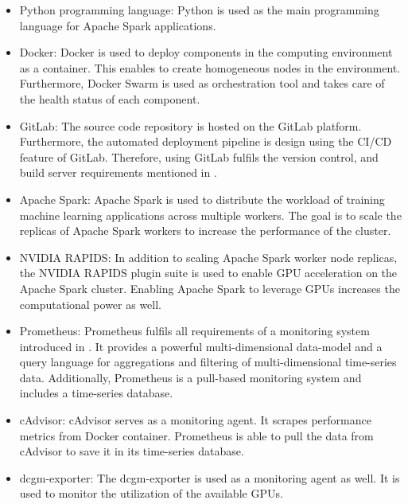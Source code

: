 \begin{itemize}
\item Python programming language: Python is used as the main programming language for Apache Spark applications.

\item Docker: Docker is used to deploy components in the computing environment as a container. This enables to create homogeneous nodes in the environment. Furthermore, Docker Swarm is used as orchestration tool and takes care of the health status of each component.

\item GitLab: The source code repository is hosted on the GitLab platform. Furthermore, the automated deployment pipeline is design using the CI/CD feature of GitLab. Therefore, using GitLab fulfils the version control, and build server requirements mentioned in .

\item Apache Spark: Apache Spark is used to distribute the workload of training machine learning applications across multiple workers. The goal is to scale the replicas of Apache Spark workers to increase the performance of the cluster.

\item NVIDIA RAPIDS: In addition to scaling Apache Spark worker node replicas, the NVIDIA RAPIDS plugin suite is used to enable GPU acceleration on the Apache Spark cluster. Enabling Apache Spark to leverage GPUs increases the computational power as well.

\item Prometheus: 
Prometheus fulfils all requirements of a monitoring system introduced in . It provides a powerful multi-dimensional data-model and a query language for aggregations and filtering of multi-dimensional time-series data. Additionally, Prometheus is a pull-based monitoring system and includes a time-series database.

\item cAdvisor:
cAdvisor serves as a monitoring agent. It scrapes performance metrics from Docker container. Prometheus is able to pull the data from cAdvisor to save it in its time-series database.

\item dcgm-exporter:
The dcgm-exporter is used as a monitoring agent as well. It is used to monitor the utilization of the available GPUs.
\end{itemize}


